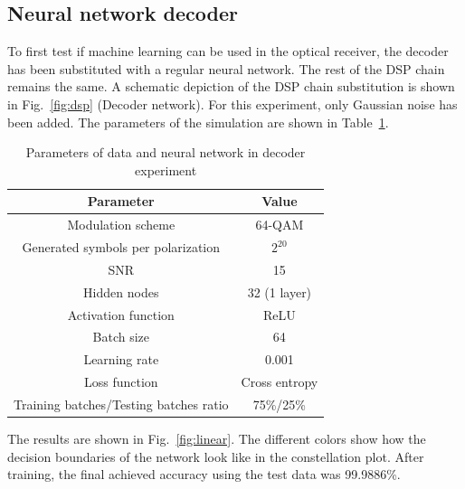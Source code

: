 \documentclass[journal,10pt,twoside, a4paper]{IEEEtran}
\begin{document}
\subsection{Neural network decoder}
To first test if machine learning can be used in the optical receiver, the decoder has been substituted with a regular neural network. The rest of the DSP chain remains the same. A schematic depiction of the DSP chain substitution is shown in Fig.~\ref{fig:dsp} (Decoder network). For this experiment, only Gaussian noise has been added. The parameters of the simulation are shown in Table~\ref{tab:linear}.

\begin{table}
    \centering
    \caption{Parameters of data and neural network in decoder experiment}
    \label{tab:linear}
    \begin{tabular}{c|c}
        Parameter & Value\\
        \hline
        Modulation scheme & 64-QAM\\
        Generated symbols per polarization & $2^{20}$\\
        SNR & 15\\
        Hidden nodes & 32 (1 layer)\\
        Activation function & ReLU\\
        Batch size & 64\\
        Learning rate & 0.001\\
        Loss function & Cross entropy\\
        Training batches/Testing batches ratio & 75\%/25\%\\
    \end{tabular}
\end{table}

The results are shown in Fig.~\ref{fig:linear}. The different colors show how the decision boundaries of the network look like in the constellation plot. After training, the final achieved accuracy using the test data was 99.9886\%.
\end{document}
